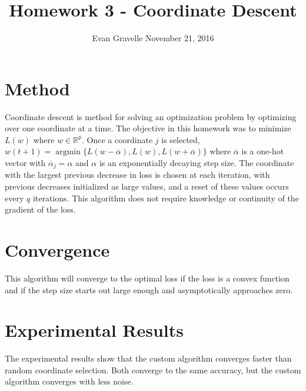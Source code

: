 \documentclass[letterpaper,10pt,onecolumn]{IEEEconf}
\newcommand{\reals}{\mathbb{R}}
\DeclareMathOperator*{\argmin}{argmin}
\begin{document}
\title{Homework 3 - Coordinate Descent}
\author{Evan Gravelle \quad \quad November 21, 2016}
\maketitle

\section{Method}

Coordinate descent is method for solving an optimization problem by optimizing over one coordinate at a time. The objective in this homework was to minimize $L(w)$ where $w \in \reals^p$. Once a coordinate $j$ is selected, $w(t+1) = \argmin\{L(w-\overline{\alpha}), L(w), L(w+\overline{\alpha})\}$ where $\overline{\alpha}$ is a one-hot vector with $\overline{\alpha}_j = \alpha$ and $\alpha$ is an exponentially decaying step size. The coordinate with the largest previous decrease in loss is chosen at each iteration, with previous decreases initialized as large values, and a reset of these values occurs every $q$ iterations. This algorithm does not require knowledge or continuity of the gradient of the loss.

\section{Convergence}

This algorithm will converge to the optimal loss if the loss is a convex function and if the step size starts out large enough and asymptotically approaches zero.

\section{Experimental Results}

The experimental results show that the custom algorithm converges faster than random coordinate selection. Both converge to the same accuracy, but the custom algorithm converges with less noise.
\end{document}
